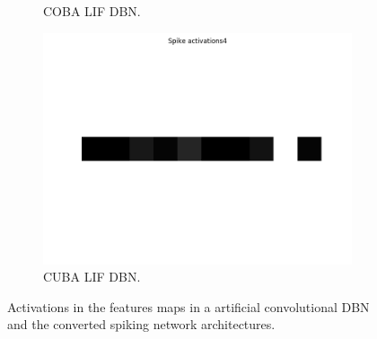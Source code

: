 \begin{figure}
\begin{subfigure}[t]{.24\textwidth}
  		\caption{COBA LIF DBN.}
  		\label{fig:sub2}
	\end{subfigure}
	\begin{subfigure}[t]{.24\textwidth}
  		\centering
  		\includegraphics[width=.9\linewidth]{imgs/convert/cuba00004.png}
  		\caption{CUBA LIF DBN.}
  		\label{fig:sub2}
	\end{subfigure}	
	\caption{Activations in the features maps in a artificial convolutional DBN and the converted spiking network architectures. }
	\label{fig:convacts}
\end{figure}


